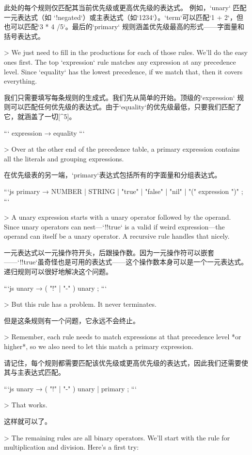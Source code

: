 \documentclass[cn,11pt,chinese]{elegantbook}
\begin{document}
此处的每个规则仅匹配其当前优先级或更高优先级的表达式。 例如，`unary` 匹配一元表达式（如 `!negated`）或主表达式（如`1234`）。`term`可以匹配`1 + 2`，但也可以匹配`3 * 4 /5`。最后的`primary` 规则涵盖优先级最高的形式——字面量和括号表达式。

> We just need to fill in the productions for each of those rules. We’ll do the easy ones first. The top `expression` rule matches any expression at any precedence level. Since `equality` has the lowest precedence, if we match that, then it covers everything.

我们只需要填写每条规则的生成式。我们先从简单的开始。顶级的`expression` 规则可以匹配任何优先级的表达式。由于`equality`的优先级最低，只要我们匹配了它，就涵盖了一切[^5]。

```
expression     → equality
```

> Over at the other end of the precedence table, a primary expression contains all the literals and grouping expressions.

在优先级表的另一端，`primary`表达式包括所有的字面量和分组表达式。

```js
primary        → NUMBER | STRING | "true" | "false" | "nil"
               | "(" expression ")" ;
```

> A unary expression starts with a unary operator followed by the operand. Since unary operators can nest—`!!true` is a valid if weird expression—the operand can itself be a unary operator. A recursive rule handles that nicely.

一元表达式以一元操作符开头，后跟操作数。因为一元操作符可以嵌套——`!!true`虽奇怪也是可用的表达式——这个操作数本身可以是一个一元表达式。递归规则可以很好地解决这个问题。

```js
unary          → ( "!" | "-" ) unary ;
```

> But this rule has a problem. It never terminates.

但是这条规则有一个问题，它永远不会终止。

> Remember, each rule needs to match expressions at that precedence level *or higher*, so we also need to let this match a primary expression.

请记住，每个规则都需要匹配该优先级或更高优先级的表达式，因此我们还需要使其与主表达式匹配。

```js
unary          → ( "!" | "-" ) unary
               | primary ;
```

> That works.

这样就可以了。

> The remaining rules are all binary operators. We’ll start with the rule for multiplication and division. Here’s a first try:
\end{document}
